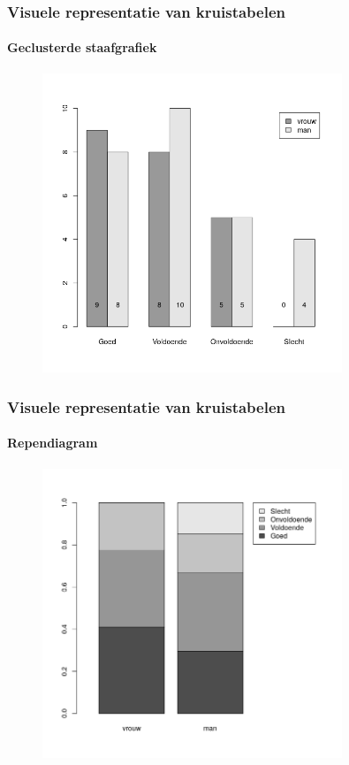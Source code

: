 \documentclass{beamer}
\begin{document}
\begin{frame}
  \frametitle{Visuele representatie van kruistabelen}
  \framesubtitle{Geclusterde staafgrafiek}

  \begin{figure}
    \centering
    \includegraphics[width=0.80\textwidth]{img/2var-staafgrafiek-geclusterd}
  \end{figure}

\end{frame}

\begin{frame}
  \frametitle{Visuele representatie van kruistabelen}
  \framesubtitle{Rependiagram}
  
  \begin{figure}
    \centering
    \includegraphics[width=0.80\textwidth]{img/2var-rependiagram-waardering-mv}
  \end{figure}

\end{frame}
\end{document}
